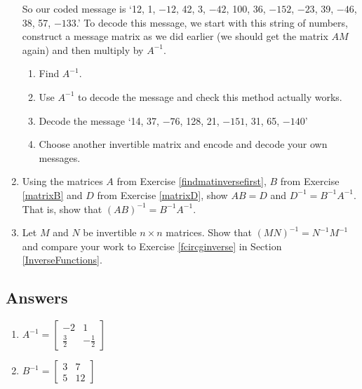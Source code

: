 \begin{enumerate}
So our coded message is `12, 1, $-12$, 42, 3, $-42$, 100, 36, $-152$, $-23$, 39, $-46$, 38, 57, $-133$.'  To decode this message, we start with this string of numbers, construct a message matrix as we did earlier (we should get the matrix $AM$ again) and then multiply by $A^{-1}$.

\begin{enumerate}

\item  Find $A^{-1}$.

\item  Use $A^{-1}$ to decode the message and check this method actually works.

\item  Decode the message `14, 37, $-76$, 128, 21, $-151$, 31, 65, $-140$'

\item  Choose another invertible matrix and encode and decode your own messages.

\end{enumerate}

\item Using the matrices $A$ from Exercise \ref{findmatinversefirst}, $B$ from Exercise \ref{matrixB} and $D$ from Exercise \ref{matrixD}, show $AB = D$ and  $D^{-1} = B^{-1}A^{-1}$.  That is, show that $(AB)^{-1} = B^{-1}A^{-1}$. 

\item Let $M$ and $N$ be invertible $n \times n$ matrices.  Show that $(MN)^{-1} = N^{-1}M^{-1}$ and compare your work to Exercise \ref{fcircginverse} in Section \ref{InverseFunctions}.


\end{enumerate}

\newpage

\subsection{Answers}

\begin{multicols}{2} 
\begin{enumerate}


\item $A^{-1} = \left[ \begin{array}{rr} -2 & 1 \\[3pt] \frac{3}{2} & -\frac{1}{2} \end{array} \right]$
\item $B^{-1} = \left[ \begin{array}{rr} 3 & 7 \\ 5 & 12 \end{array} \right]$

\setcounter{HW}{\value{enumi}}
\end{enumerate}
\end{multicols}

